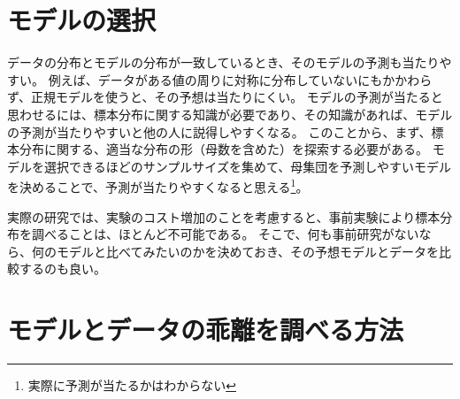 \section{モデルの選択}
データの分布とモデルの分布が一致しているとき、そのモデルの予測も当たりやすい。
例えば、データがある値の周りに対称に分布していないにもかかわらず、正規モデルを使うと、その予想は当たりにくい。
モデルの予測が当たると思わせるには、標本分布に関する知識が必要であり、その知識があれば、モデルの予測が当たりやすいと他の人に説得しやすくなる。
このことから、まず、標本分布に関する、適当な分布の形（母数を含めた）を探索する必要がある。
モデルを選択できるほどのサンプルサイズを集めて、母集団を予測しやすいモデルを決めることで、予測が当たりやすくなると思える\footnote{実際に予測が当たるかはわからない}。

実際の研究では、実験のコスト増加のことを考慮すると、事前実験により標本分布を調べることは、ほとんど不可能である。
そこで、何も事前研究がないなら、何のモデルと比べてみたいのかを決めておき、その予想モデルとデータを比較するのも良い。
\fi




\section{モデルとデータの乖離を調べる方法}

